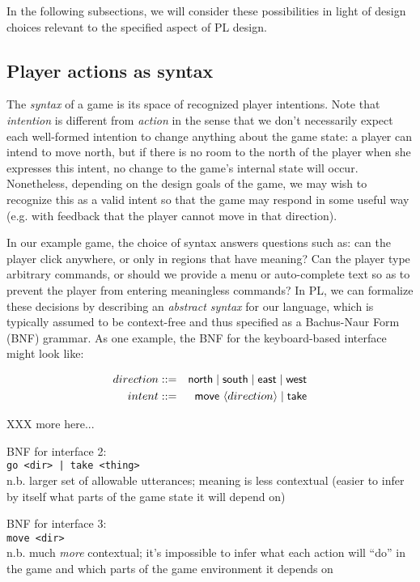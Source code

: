   In the following subsections, we will consider these possibilities in
  light of design choices relevant to the specified aspect of PL design.

  \subsection{Player actions as syntax}

  The {\em syntax} of a game is its space of recognized player intentions.
  Note that {\em intention} is different from {\em action} in the sense
  that we don't necessarily expect each well-formed intention to change
  anything about the game state: a player can intend to move north, but if
  there is no room to the north of the player when she expresses this
  intent, no change to the game's internal state will occur. Nonetheless,
  depending on the design goals of the game, we may wish to recognize this
  as a valid intent so that the game may respond in some useful way (e.g.
  with feedback that the player cannot move in that direction).
  
  In our example game, the choice of syntax answers questions such as: can
  the player click anywhere, or only in regions that have meaning? Can the
  player type arbitrary commands, or should we provide a menu or
  auto-complete text so as to prevent the player from entering meaningless
  commands?
  In PL, we can formalize these decisions by describing an {\em abstract
  syntax} for our language, which is typically assumed to be context-free
  and thus specified as a Bachus-Naur Form (BNF) grammar. As one example,
  the BNF for the keyboard-based interface might look like:

  \begin{eqnarray*}
  direction &::=& \mathsf{north} \mid \mathsf{south} \mid \mathsf{east}
    \mid \mathsf{west} \\
  intent &::=& \mathsf{move}\  \langle direction \rangle \mid \mathsf{take}
  \end{eqnarray*}

  XXX more here...

  BNF for interface 2:\\
  \verb/go <dir> | take <thing>/\\
  n.b. larger set of allowable utterances; meaning is less contextual
  (easier to infer by itself what parts of the game state it will depend
  on)

  BNF for interface 3:\\
  \verb/move <dir>/\\
  n.b. much {\em more} contextual; it's impossible to infer what each
  action will ``do'' in the game and which parts of the game environment it
  depends on

